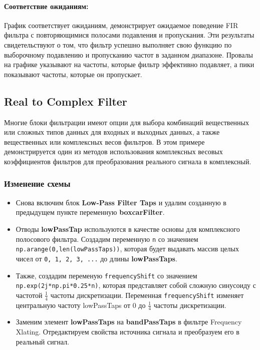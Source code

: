 \documentclass[a4paper,12pt]{extarticle}
\begin{document}
\paragraph{Соответствие ожиданиям:}
График соответствует ожиданиям, демонстрирует ожидаемое поведение FIR фильтра с повторяющимися 
полосами подавления и пропускания. Эти результаты свидетельствуют о том, что фильтр успешно 
выполняет свою функцию по выборочному подавлению и пропусканию частот в заданном диапазоне. Провалы 
на графике указывают на частоты, которые фильтр эффективно подавляет, а пики показывают частоты, 
которые он пропускает.

\subsection{Real to Complex Filter}

\hspace{1.15cm}Многие блоки фильтрации имеют опции для выбора комбинаций вещественных или сложных 
типов данных для входных и выходных данных, а также вещественных или комплексных весов фильтров. 
В этом примере демонстрируется один из методов использования комплексных весовых коэффициентов 
фильтров для преобразования реального сигнала в комплексный.

\subsubsection{Изменение схемы}

\begin{itemize}
    \item Снова включим блок \textbf{Low-Pass Filter Taps} и удалим созданную в предыдущем 
    пункте переменную \textbf{boxcarFilter}.
    \item Отводы \textbf{lowPassTap} используются в качестве основы для комплексного полосового 
    фильтра. Создадим переменную \texttt{n} со значением \texttt{np.arange(0,len(lowPassTaps))}, 
    которая будет выдавать массив целых чисел от \texttt{0, 1, 2, 3, ...} до длины \textbf{lowPassTaps}.
    \item Также, создадим переменую \texttt{frequencyShift} со значением \texttt{np.exp(2j*np.pi*0.25*n)},
    которая представляет собой сложную синусоиду с частотой \(\frac{1}{4}\) частоты дискретизации. Переменная 
    \texttt{frequencyShift} изменяет центральную частоту lowPassTaps от 0 до \(\frac{1}{4}\) частоты дискретизации.
    \item Заменим элемент \textbf{lowPassTaps} на \textbf{bandPassTaps} в фильтре Frequency Xlating. 
    Отредактируем свойства источника сигнала и преобразуем его в реальный сигнал.
\end{itemize}
\end{document}

